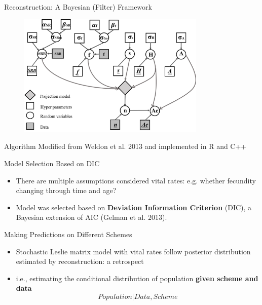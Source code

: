 \documentclass{beamer}
\begin{document}
\begin{frame}{Reconstruction: A Bayesian (Filter) Framework}
\begin{figure}[ht]
	\centering
	\includegraphics[width=0.8\textwidth]{fig/Chicago_deer/Bayes.png}
	\label{Bayes}
\end{figure}

{\footnotesize Algorithm Modified from Weldon et al. 2013 and implemented in R and C++}
\end{frame}

\begin{frame}{Model Selection Based on DIC}
\renewcommand\baselinestretch{1.25}\selectfont
\begin{itemize}
	\item There are multiple assumptions considered vital rates: e.g. whether fecundity changing through time and age?
	\item Model was selected based on \textbf{Deviation Information Criterion} (DIC), a Bayesian extension of AIC (Gelman et al. 2013).
\end{itemize}
\renewcommand\baselinestretch{1.25}\selectfont
\end{frame}

\begin{frame}{Making Predictions on Different Schemes}
\begin{itemize}
	\item Stochastic Leslie matrix model with vital rates follow posterior distribution estimated by reconstruction: a retrospect
	\item i.e., estimating the conditional distribution of population \textbf{given scheme and data}
	\[
	Population|Data,Scheme
	\]
\end{itemize}
\end{frame}
\end{document}
